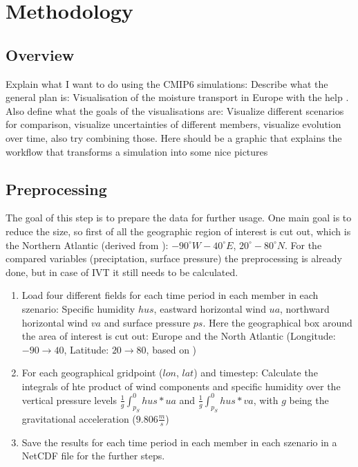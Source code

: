 \chapter{Methodology}
\label{ch:methodology}

\section{Overview}

Explain what I want to do using the CMIP6 simulations: Describe what the general plan is: Visualisation of the moisture transport in Europe with the help . 
Also define what the goals of the visualisations are: Visualize different scenarios for comparison, visualize uncertainties of different members, visualize evolution over time, also try combining those. 
Here should be a graphic that explains the workflow that transforms a simulation into some nice pictures


\section{Preprocessing}

The goal of this step is to prepare the data for further usage. 
One main goal is to reduce the size, so first of all the geographic region of interest is cut out, which is the Northern Atlantic (derived from \cite{vietinghoff_visual_2021}): $-90^\circ W - 40^\circ E$, $20^\circ - 80^\circ N$. 
For the compared variables (preciptation, surface pressure) the preprocessing is already done, but in case of IVT it still needs to be calculated. 


\begin{enumerate}
  \item Load four different fields for each time period in each member in each szenario: Specific humidity $hus$, eastward horizontal wind $ua$, northward horizontal wind $va$ and surface pressure $ps$. Here the geographical box around the area of interest is cut out: Europe and the North Atlantic (Longitude: $-90 \to 40$, Latitude: $20 \to 80$, based on \cite{vietinghoff_visual_2021})
  \item For each geographical gridpoint ($lon$, $lat$) and timestep: Calculate the integrals of hte product of wind components and specific humidity over the vertical pressure levels $\frac{1}{g}\int_{p_S}^0 hus * ua$ and  $\frac{1}{g}\int_{p_S}^0 hus * va$, with $g$ being the gravitational acceleration ($9.806 \frac{m}{s}$) 
  \item Save the results for each time period in each member in each szenario in a NetCDF file for the further steps. 
  
\end{enumerate}

